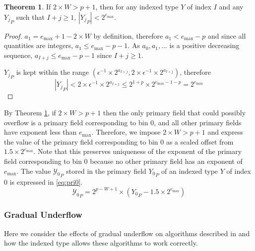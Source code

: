 \documentclass[12pt]{article}
\providecommand{\max}{\ensuremath{\text{max}}}
\theoremstyle{definition}
\newtheorem{thm}{Theorem}[section]
\numberwithin{equation}{section}
\numberwithin{figure}{section}
\begin{document}
      \begin{samepage}
      \begin{thm}
        If $2\times W > p + 1$, then for any indexed type $Y$ of index $I$ and any ${Y_j}_P$ such that $I + j \geq 1$, $|{Y_j}_P| < 2^{e_{\max}}$.
        \label{thm:overflow}
      \end{thm}
    \end{samepage}

      \begin{proof}
        $a_1 = e_{\max} + 1 - 2\times W$ by definition, therefore $a_1 < e_{\max} - p$ and since all quantities are integers, $a_1 \leq e_{\max} - p - 1$. As $a_0, a_1, ...$ is a positive decreasing sequence, $a_{I + j} \leq e_{\max} - p - 1$ since $I + j \geq 1$.

        ${Y_j}_P$ is kept within the range $(\epsilon^{-1} \times 2^{a_{I + j}}, 2 \times \epsilon^{-1} \times 2^{a_{I + j}})$, therefore
        \begin{equation*}
          |{Y_j}_P| < 2 \times \epsilon^{-1} \times 2^{a_{I + j}} \leq 2^{1 + p} \times 2^{e_{\max} - 1 - p} = 2^{e_{\max}}
        \end{equation*}
      \end{proof}
      By Theorem \ref{thm:overflow}, if $2\times W > p + 1$ then the only primary field that could possibly overflow is a primary field corresponding to bin 0, and all other primary fields have exponent less than $e_{\max}$. Therefore, we impose $2\times W > p + 1$ and express the value of the primary field corresponding to bin 0 as a scaled offset from $1.5\times2^{e_{\max}}$. Note that this preserves uniqueness of the exponent of the primary field corresponding to bin 0 because no other primary field has an exponent of $e_{\max}$. The value ${\mathcal{Y}_0}_P$ stored in the primary field ${Y_0}_P$ of an indexed type $Y$ of index 0 is expressed in \eqref{eq:pri0}.
      \begin{equation}
        {\mathcal{Y}_0}_P = 2^{p - W + 1}\times({Y_0}_P - 1.5\times2^{e_{\max}})
        \label{eq:pri0}
      \end{equation}
    \subsubsection{Gradual Underflow}
      \label{sec:indexed_underflow_gradual}
      Here we consider the effects of gradual underflow on algorithms described in \cite{repsum} and how the indexed type allows these algorithms to work correctly.
\end{document}
